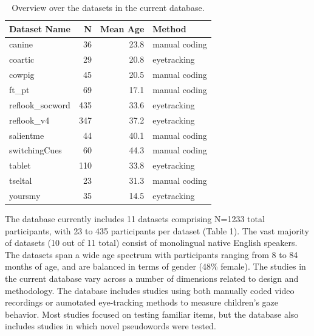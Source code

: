 \documentclass[10pt, letterpaper]{article}
\begin{document}
\begin{table}[H]
\centering
\begingroup\fontsize{9pt}{10pt}\selectfont
\begin{tabular}{lrrl}
  \hline
Dataset Name & N & Mean Age & Method \\ 
  \hline
canine & 36 & 23.8 & manual coding \\ 
  coartic & 29 & 20.8 & eyetracking \\ 
  cowpig & 45 & 20.5 & manual coding \\ 
  ft\_pt & 69 & 17.1 & manual coding \\ 
  reflook\_socword & 435 & 33.6 & eyetracking \\ 
  reflook\_v4 & 347 & 37.2 & eyetracking \\ 
  salientme & 44 & 40.1 & manual coding \\ 
  switchingCues & 60 & 44.3 & manual coding \\ 
  tablet & 110 & 33.8 & eyetracking \\ 
  tseltal & 23 & 31.3 & manual coding \\ 
  yoursmy & 35 & 14.5 & eyetracking \\ 
   \hline
\end{tabular}
\endgroup
\caption{Overview over the datasets in the current database.} 
\end{table}

The database currently includes 11 datasets comprising N=1233 total
participants, with 23 to 435 participants per dataset (Table 1). The
vast majority of datasets (10 out of 11 total) consist of monolingual
native English speakers. The datasets span a wide age spectrum with
participants ranging from 8 to 84 months of age, and are balanced in
terms of gender (48\% female). The studies in the current database vary
across a number of dimensions related to design and methodology. The
database includes studies using both manually coded video recordings or
aumotated eye-tracking methods to measure children's gaze behavior. Most
studies focused on testing familiar items, but the database also
includes studies in which novel pseudowords were tested.
\end{document}
